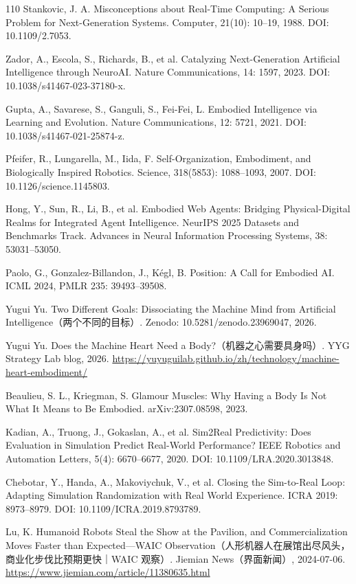 \documentclass[10pt]{article}
\begin{document}
\begin{thebibliography}{110}
Stankovic, J. A. Misconceptions about Real-Time Computing: A Serious Problem for Next-Generation Systems. Computer, 21(10): 10–19, 1988. DOI: 10.1109/2.7053.

Zador, A., Escola, S., Richards, B., et al. Catalyzing Next-Generation Artificial Intelligence through NeuroAI. Nature Communications, 14: 1597, 2023. DOI: 10.1038/s41467-023-37180-x.

Gupta, A., Savarese, S., Ganguli, S., Fei-Fei, L. Embodied Intelligence via Learning and Evolution. Nature Communications, 12: 5721, 2021. DOI: 10.1038/s41467-021-25874-z.

Pfeifer, R., Lungarella, M., Iida, F. Self-Organization, Embodiment, and Biologically Inspired Robotics. Science, 318(5853): 1088–1093, 2007. DOI: 10.1126/science.1145803.

Hong, Y., Sun, R., Li, B., et al. Embodied Web Agents: Bridging Physical-Digital Realms for Integrated Agent Intelligence. NeurIPS 2025 Datasets and Benchmarks Track. Advances in Neural Information Processing Systems, 38: 53031–53050.

Paolo, G., Gonzalez-Billandon, J., Kégl, B. Position: A Call for Embodied AI. ICML 2024, PMLR 235: 39493–39508.

Yugui Yu. Two Different Goals: Dissociating the Machine Mind from Artificial Intelligence（两个不同的目标）. Zenodo: 10.5281/zenodo.23969047, 2026.

Yugui Yu. Does the Machine Heart Need a Body?（机器之心需要具身吗）. YYG Strategy Lab blog, 2026. \url{https://yuyuguilab.github.io/zh/technology/machine-heart-embodiment/}

Beaulieu, S. L., Kriegman, S. Glamour Muscles: Why Having a Body Is Not What It Means to Be Embodied. arXiv:2307.08598, 2023.

Kadian, A., Truong, J., Gokaslan, A., et al. Sim2Real Predictivity: Does Evaluation in Simulation Predict Real-World Performance? IEEE Robotics and Automation Letters, 5(4): 6670–6677, 2020. DOI: 10.1109/LRA.2020.3013848.

Chebotar, Y., Handa, A., Makoviychuk, V., et al. Closing the Sim-to-Real Loop: Adapting Simulation Randomization with Real World Experience. ICRA 2019: 8973–8979. DOI: 10.1109/ICRA.2019.8793789.

Lu, K. Humanoid Robots Steal the Show at the Pavilion, and Commercialization Moves Faster than Expected---WAIC Observation（人形机器人在展馆出尽风头，商业化步伐比预期更快｜WAIC 观察）. Jiemian News（界面新闻）, 2024-07-06. \url{https://www.jiemian.com/article/11380635.html}


\end{thebibliography}
\end{document}
